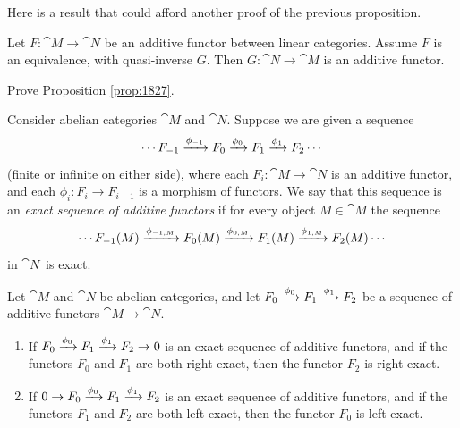 Here is a result that could afford another proof of the previous proposition. 

\begin{prop} \label{prop:1827}
Let $F : \cat{M} \to \cat{N}$ be an additive functor between linear
categories. Assume $F$ is an equivalence, with quasi-inverse $G$. Then 
$G : \cat{N} \to \cat{M}$ is an additive functor.
\end{prop}

\begin{exer} \label{exer:1827}
Prove Proposition \ref{prop:1827}.
\end{exer}

\begin{dfn} \label{dfn:3620}
Consider abelian categories $\cat{M}$ and $\cat{N}$. 
Suppose we are given a sequence 
\[ \cdots F_{-1} \xrightarrow{\phi_{-1}} F_0 \xrightarrow{\phi_0} F_1 \xrightarrow{\phi_1} F_2 \cdots \]
(finite or infinite on either side), 
where each $F_i : \cat{M} \to \cat{N}$ is an additive functor, and each
$\phi_i : F_i \to F_{i + 1}$
is a morphism of functors. We say that this sequence is an {\em exact sequence 
of additive functors} if for every object $M \in \cat{M}$ the sequence 
\[ \cdots F_{-1}(M) \xrightarrow{\phi_{-1, M}} F_0(M) \xrightarrow{\phi_{0, M}} F_1(M) 
\xrightarrow{\phi_{1, M}} F_2(M) \cdots \]
in $\cat{N}$\ is exact.
\end{dfn}

\begin{prop} \label{prop:3620}
Let $\cat{M}$ and $\cat{N}$ be abelian categories, and let 
$F_0 \xrightarrow{\phi_0} F_1 \xrightarrow{\phi_1} F_2$
be a sequence of additive functors $\cat{M} \to \cat{N}$.
\begin{enumerate}
\item If  
$F_0 \xrightarrow{\phi_0} F_1 \xrightarrow{\phi_1} F_2 \to 0$
is an exact sequence of additive functors, and if the functors $F_0$ and $F_1$ 
are both right exact, then the functor $F_2$ is right exact. 

\item If  
$0 \to F_0 \xrightarrow{\phi_0} F_1 \xrightarrow{\phi_1} F_2$
is an exact sequence of additive functors, and if the functors $F_1$ and $F_2$ 
are both left exact, then the functor $F_0$ is left exact.
\end{enumerate}
\end{prop}


